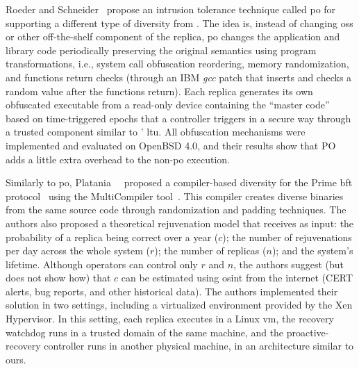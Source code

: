 Roeder and Schneider~\cite{Roeder:2010} propose an intrusion tolerance technique called \gls{po} for supporting a different type of diversity from \system.
The idea is, instead of changing \glspl{os} or other off-the-shelf component of the replica, \gls{po} changes the application and library code periodically preserving the original semantics using program transformations, i.e., system call obfuscation reordering, memory randomization, and functions return checks (through an IBM \textit{gcc} patch that inserts and checks a random value after the functions return).
Each replica generates its own obfuscated executable from a read-only device containing the ``master code'' based on time-triggered epochs that a controller triggers in a secure way through a trusted component similar to \system' \gls{ltu}.
All obfuscation mechanisms were implemented and evaluated on OpenBSD 4.0, and their results show that PO adds a little extra overhead to the non-\gls{po} execution.

Similarly to \gls{po}, Platania~\etal{}~\cite{Platania:2014} proposed a compiler-based diversity for the Prime \gls{bft} protocol~\cite{Amir:2011} using the MultiCompiler tool~\cite{Homescu:2013}. 
This compiler creates diverse binaries from the same source code through randomization and padding techniques.
The authors also proposed a theoretical rejuvenation model that receives as input: the probability of a replica being correct over a year ($c$); the number of rejuvenations per day across the whole system ($r$); the number of replicas ($n$); and the system's lifetime. 
Although operators can control only $r$ and $n$, the authors suggest (but does not show how) that $c$ can be estimated using \gls{osint} from the internet (CERT alerts, bug reports, and other historical data).
The authors implemented their solution in two settings, including a virtualized environment provided by the Xen Hypervisor.
In this setting, each replica executes in a Linux \gls{vm}, the recovery watchdog runs in a trusted domain of the same machine, and the proactive-recovery controller runs in another physical machine, in an architecture similar to ours.


